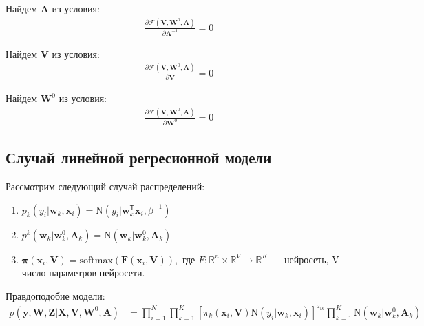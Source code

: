 \documentclass[12pt, twoside]{article}
\numberwithin{equation}{section}
\begin{document}
Найдем $\textbf{A}$ из условия:
\begin{equation}
\label{eq:st:8}
\begin{aligned}
\frac{\partial \mathcal{F}\left(\textbf{V}, \textbf{W}^{0}, \textbf{A}\right)}{\partial \textbf{A}^{-1}} = 0 
\end{aligned}
\end{equation}

Найдем $\textbf{V}$ из условия:
\begin{equation}
\label{eq:st:9}
\begin{aligned}
\frac{\partial \mathcal{F}\left(\textbf{V}, \textbf{W}^{0}, \textbf{A}\right)}{\partial \textbf{V}} = 0 
\end{aligned}
\end{equation}

Найдем $\textbf{W}^{0}$ из условия:
\begin{equation}
\label{eq:st:10}
\begin{aligned}
\frac{\partial \mathcal{F}\left(\textbf{V}, \textbf{W}^{0}, \textbf{A}\right)}{\partial \textbf{W}^{0}} = 0 
\end{aligned}
\end{equation}

\subsection{Случай линейной регресионной модели}
Рассмотрим следующий случай распределений:
\begin{enumerate}
	\item $p_{k}\left(y_{i}|\textbf{w}_{k}, \textbf{x}_{i}\right) = \text{N}\left(y_{i}|\textbf{w}_{k}^{\mathsf{T}}\textbf{x}_{i}, \beta^{-1}\right)$
	\item $p^{k}\left(\textbf{w}_{k}|\textbf{w}^{0}_{k}, \textbf{A}_{k}\right) = \text{N}\left(\textbf{w}_{k}|\textbf{w}^{0}_{k}, \textbf{A}_{k}\right)$
	\item $\bm{\pi}\left(\textbf{x}_{i}, \textbf{V}\right) = \text{softmax}\left(\textbf{F}\left(\textbf{x}_{i}, \textbf{V}\right)\right),$ где $F : \mathbb{R}^{n}\times\mathbb{R}^{V}\to \mathbb{R}^{K}$ --- нейросеть, V --- число параметров нейросети. 
\end{enumerate}


Правдоподобие модели:
\begin{equation}
\label{eq:st:lin:1}
\begin{aligned}
p\left(\textbf{y}, \textbf{W}, \textbf{Z}|\textbf{X}, \textbf{V}, \textbf{W}^{0}, \textbf{A}\right) &= \prod_{i=1}^{N}\prod_{k=1}^{K}\left[\pi_{k}\left(\textbf{x}_i,\textbf{V}\right)\text{N}\left(y_i|\textbf{w}_{k}, \textbf{x}_i\right)\right]^{z_{ik}}\prod_{k=1}^{K}\text{N}\left(\textbf{w}_{k}|\textbf{w}^{0}_{k}, \textbf{A}_{k}\right)
\end{aligned}
\end{equation}
\end{document}
